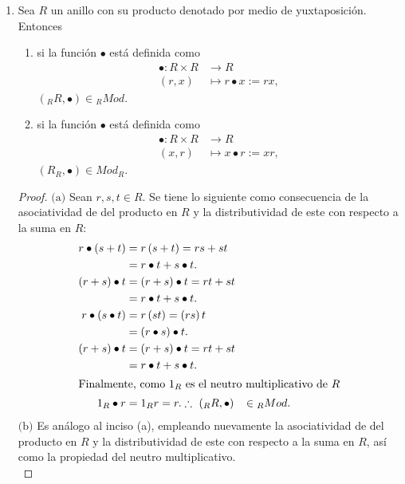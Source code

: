 \documentclass{article}
\newcommand{\lrprth}[1]{
	\left(#1\right)
}
\newcommand{\descapp}[6]{
	#1: #2 &\rightarrow #3\\
	#4 &\mapsto #5#6 
}
\theoremstyle{definition}
\theoremstyle{plain}
\theoremstyle{plain}
\theoremstyle{definition}
\theoremstyle{definition}
\theoremstyle{definition}
\theoremstyle{definition}
\theoremstyle{definition}
\theoremstyle{definition}
\begin{document}
\begin{enumerate}[label=\textbf{Ej \arabic*.}]
		\item Sea $R$ un anillo con su producto denotado por medio de yuxtaposición. Entonces
		\begin{enumerate}[label=(\alph*)]
			\item si la función $\bullet$ está definida como
			\begin{align*}
				\descapp{\bullet}{R\times R}{R}{(r,x)}{r\bullet x:=rx}{,}
			\end{align*}
			$\lrprth{{}_RR,\bullet}\in {}_RMod$.
			\item si la función $\bullet$ está definida como
			\begin{align*}
				\descapp{\bullet}{R\times R}{R}{(x,r)}{x\bullet r:=xr}{,}
			\end{align*}
			$(R_R,\bullet)\in Mod_R$.
		\end{enumerate}
		\begin{proof}
			$\boxed{\text{(a)}}$ 
			Sean $r,s,t\in R$. Se tiene lo siguiente como consecuencia de la asociatividad de del producto en $R$ y la distributividad de este con respecto a la suma en $R$:
			\begin{align*}
				r\bullet\lrprth{s+t}&=r\lrprth{s+t}=rs+st\\
				&=r\bullet t + s\bullet t.\\
				\lrprth{r+s}\bullet t&=\lrprth{r+s}\bullet t=rt+st\\
				&=r\bullet t + s\bullet t.\\
				r\bullet\lrprth{s\bullet t}&=r\lrprth{st}=\lrprth{rs}t\\
				&=\lrprth{r\bullet s}\bullet t.\\
				\lrprth{r+s}\bullet t&=\lrprth{r+s}\bullet t=rt+st\\
				&=r\bullet t + s\bullet t.\\
				\intertext{Finalmente, como $1_R$ es el neutro multiplicativo de $R$}
				1_R\bullet r&= 1_Rr=r.
				\therefore \ \lrprth{{}_RR,\bullet}&\in {}_RMod.
			\end{align*}
			$\boxed{\text{(b)}}$ Es análogo al inciso (a), empleando nuevamente la asociatividad de del producto en $R$ y la distributividad de este con respecto a la suma en $R$, así como la propiedad del neutro multiplicativo. \\
		\end{proof}
		

\end{enumerate}
\end{document}
